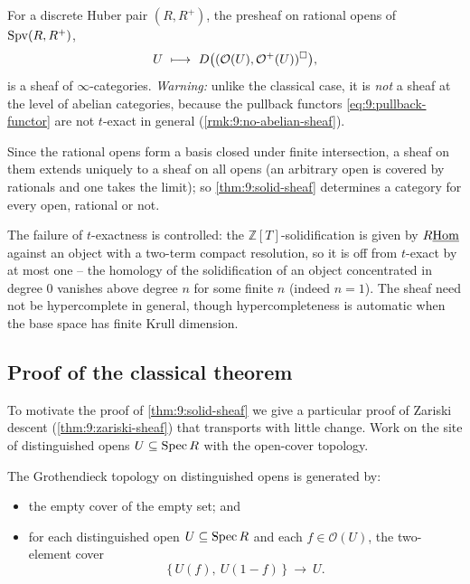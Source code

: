 \begin{theorem}
\label{thm:9:solid-sheaf}
For a discrete Huber pair $(R,R^{+})$, the presheaf on rational opens of
$\operatorname{Spv}(R,R^{+})$,
\begin{equation*}
U\ \longmapsto\ D\bigl((\mathcal O(U),\mathcal O^{+}(U))^{\square}\bigr),
\end{equation*}
is a sheaf of $\infty$-categories. \emph{Warning:} unlike the classical case, it
is \emph{not} a sheaf at the level of abelian categories, because the pullback
functors \eqref{eq:9:pullback-functor} are not $t$-exact in general
(\cref{rmk:9:no-abelian-sheaf}).
\end{theorem}

Since the rational opens form a basis closed under finite intersection, a sheaf
on them extends uniquely to a sheaf on all opens (an arbitrary open is covered
by rationals and one takes the limit); so \cref{thm:9:solid-sheaf} determines a
category for every open, rational or not.

\begin{remark}
\label{rmk:9:bounded-discrepancy}
The failure of $t$-exactness is controlled: the $\mathbb{Z}[T]$-solidification is
given by $R\underline{\operatorname{Hom}}$ against an object with a two-term compact resolution, so it is
off from $t$-exact by at most one -- the homology of the solidification of an
object concentrated in degree $0$ vanishes above degree $n$ for some finite $n$
(indeed $n=1$). The sheaf need not be hypercomplete in general, though
hypercompleteness is automatic when the base space has finite Krull dimension.
\end{remark}

\subsection{Proof of the classical theorem}

To motivate the proof of \cref{thm:9:solid-sheaf} we give a particular proof of
Zariski descent (\cref{thm:9:zariski-sheaf}) that transports with little change.
Work on the site of distinguished opens $U\subseteq\operatorname{Spec} R$ with the open-cover
topology.

\begin{lemma}
\label{lem:9:zariski-covers}
The Grothendieck topology on distinguished opens is generated by:
\begin{itemize}
\item the empty cover of the empty set; and
\item for each distinguished open $U\subseteq\operatorname{Spec} R$ and each $f\in\mathcal
O(U)$, the two-element cover
\begin{equation}
\label{eq:9:zariski-basic-cover}
\bigl\{\,U(f),\ U(1-f)\,\bigr\}\ \longrightarrow\ U.
\end{equation}
\end{itemize}
\end{lemma}

